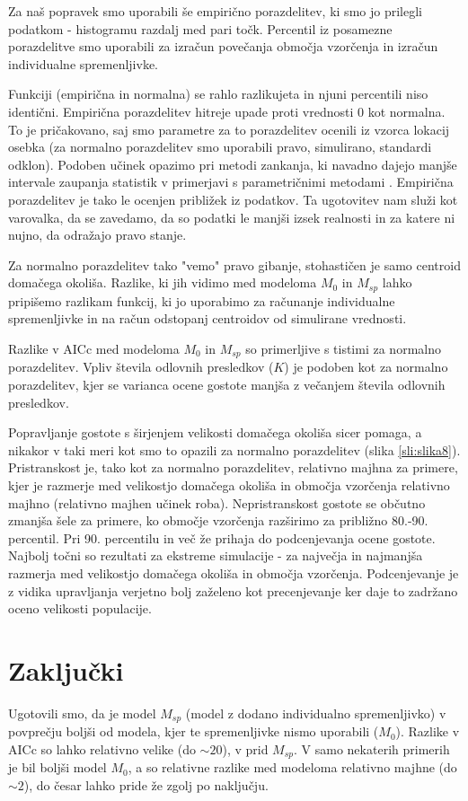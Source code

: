 Za naš popravek smo uporabili še empirično porazdelitev, ki smo jo prilegli podatkom - histogramu razdalj med pari točk. Percentil iz posamezne porazdelitve smo uporabili za izračun povečanja območja vzorčenja in izračun individualne spremenljivke.

Funkciji (empirična in normalna) se rahlo razlikujeta in njuni percentili niso identični. Empirična porazdelitev hitreje upade proti vrednosti 0 kot normalna. To je pričakovano, saj smo parametre za to porazdelitev ocenili iz vzorca lokacij osebka (za normalno porazdelitev smo uporabili pravo, simulirano, standardi odklon). Podoben učinek opazimo pri metodi zankanja, ki navadno dajejo manjše intervale zaupanja statistik v primerjavi s parametričnimi metodami \citep{hesterberg_what_2015}. Empirična porazdelitev je tako le ocenjen približek iz podatkov. Ta ugotovitev nam služi kot varovalka, da se zavedamo, da so podatki le manjši izsek realnosti in za katere ni nujno, da odražajo pravo stanje.

Za normalno porazdelitev tako "vemo" pravo gibanje, stohastičen je samo centroid domačega okoliša. Razlike, ki jih vidimo med modeloma $M_0$ in $M_{sp}$ lahko pripišemo razlikam funkcij, ki jo uporabimo za računanje individualne spremenljivke in na račun odstopanj centroidov od simulirane vrednosti.

Razlike v AICc med modeloma $M_0$ in $M_{sp}$ so primerljive s tistimi za normalno porazdelitev. Vpliv števila odlovnih presledkov ($K$) je podoben kot za normalno porazdelitev, kjer se varianca ocene gostote manjša z večanjem števila odlovnih presledkov.

Popravljanje gostote s širjenjem velikosti domačega okoliša sicer pomaga, a nikakor v taki meri kot smo to opazili za normalno porazdelitev (slika \ref{sli:slika8}). Pristranskost je, tako kot za normalno porazdelitev, relativno majhna za primere, kjer je razmerje med velikostjo domačega okoliša in območja vzorčenja relativno majhno (relativno majhen učinek roba). Nepristranskost gostote se občutno zmanjša šele za primere, ko območje vzorčenja razširimo za približno 80.-90. percentil. Pri 90. percentilu in več že prihaja do podcenjevanja ocene gostote. Najbolj točni so rezultati za ekstreme simulacije - za največja in najmanjša razmerja med velikostjo domačega okoliša in območja vzorčenja. Podcenjevanje je z vidika upravljanja verjetno bolj zaželeno kot precenjevanje ker daje to zadržano oceno velikosti populacije.

\section{Zaključki}
Ugotovili smo, da je model $M_{sp}$ (model z dodano individualno spremenljivko) v povprečju boljši od modela, kjer te spremenljivke nismo uporabili ($M_0$). Razlike v AICc so lahko relativno velike (do $\sim 20$), v prid $M_{sp}$. V samo nekaterih primerih je bil boljši model $M_0$, a so relativne razlike med modeloma relativno majhne (do $\sim 2$), do česar lahko pride že zgolj po naključju.

